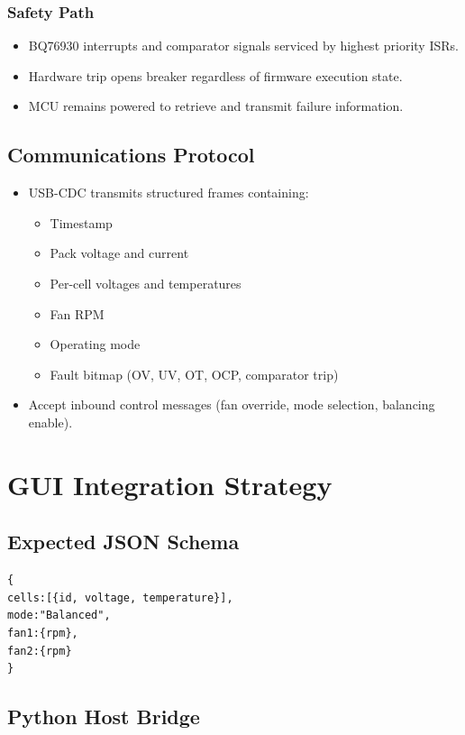 \documentclass[12pt]{article}
\begin{document}
\subsubsection{Safety Path}

\begin{itemize}
\item BQ76930 interrupts and comparator signals serviced by highest priority ISRs.
\item Hardware trip opens breaker regardless of firmware execution state.
\item MCU remains powered to retrieve and transmit failure information.
\end{itemize}

\subsection{Communications Protocol}

\begin{itemize}
\item USB-CDC transmits structured frames containing:
\begin{itemize}
\item Timestamp
\item Pack voltage and current
\item Per-cell voltages and temperatures
\item Fan RPM
\item Operating mode
\item Fault bitmap (OV, UV, OT, OCP, comparator trip)
\end{itemize}
\item Accept inbound control messages (fan override, mode selection, balancing enable).
\end{itemize}

\section{GUI Integration Strategy}

\subsection{Expected JSON Schema}

\begin{verbatim}
{
cells:[{id, voltage, temperature}],
mode:"Balanced",
fan1:{rpm},
fan2:{rpm}
}
\end{verbatim}

\subsection{Python Host Bridge}
\end{document}
